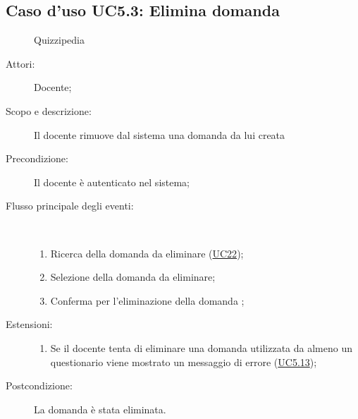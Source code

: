 \subsection{Caso d'uso UC5.3: Elimina domanda}
	\begin{figure}[H]
		\centering
		\begin{resizedtikzpicture}{\textwidth}
		\begin{umlsystem}[x=0, fill=lightgray!20]{Quizzipedia}
		\end{umlsystem}
		\end{resizedtikzpicture}
		\caption{}
	\end{figure}
\begin{description}
\item[Attori:] Docente;
\item[Scopo e descrizione:] Il docente rimuove dal sistema una domanda da lui creata
      \item[Precondizione:] Il docente è autenticato nel sistema;

        \item[Flusso principale degli eventi:] \ 
 \begin{enumerate}
          \item Ricerca della domanda da eliminare (\hyperlink{UC22}{UC22});
          \item Selezione della domanda da eliminare;
          \item Conferma per l'eliminazione della domanda	;

      \end{enumerate}
    \item[Estensioni:]
      \begin{enumerate}
          \item Se il docente tenta di eliminare una domanda utilizzata da almeno un questionario viene mostrato un messaggio di errore (\hyperlink{UC5.13}{UC5.13});

      \end{enumerate}
    \item[Postcondizione:] La domanda è stata eliminata.
  \end{description}
\hypertarget{UC5.4}{}

